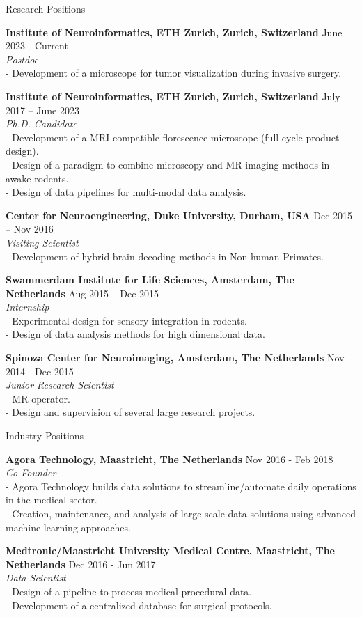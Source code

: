 \documentclass{resume}
\begin{document}
\begin{sections}{Research Positions}

{\bf Institute of Neuroinformatics, ETH Zurich, Zurich, Switzerland} \hfill {June 2023 - Current} 
\\{\textit{Postdoc}}
\\- Development of a microscope for tumor visualization during invasive surgery.

{\bf Institute of Neuroinformatics, ETH Zurich, Zurich, Switzerland} \hfill {July 2017 – June 2023} 
\\{\textit{Ph.D. Candidate}}
\\- Development of a MRI compatible florescence microscope (full-cycle product design).
\\- Design of a paradigm to combine microscopy and MR imaging methods in awake rodents. 
\\- Design of data pipelines for multi-modal data analysis.

{\bf Center for Neuroengineering, Duke University, Durham, USA} \hfill {Dec 2015 – Nov 2016} 
\\{\textit{Visiting Scientist}}
\\- Development of hybrid brain decoding methods in Non-human Primates.

{\bf Swammerdam Institute for Life Sciences, Amsterdam, The Netherlands} \hfill {Aug 2015 – Dec 2015} 
\\{\textit{Internship}}
\\- Experimental design for sensory integration in rodents.
\\- Design of data analysis methods for high dimensional data.

{\bf Spinoza Center for Neuroimaging, Amsterdam, The Netherlands} \hfill {Nov 2014 - Dec 2015} 
\\{\textit{Junior Research Scientist}}
\\- MR operator.
\\- Design and supervision of several large research projects.

\end{sections}

\cleardoublepage

\begin{sections}{Industry Positions}

{\bf Agora Technology, Maastricht, The Netherlands} \hfill {Nov 2016 - Feb 2018} 
\\{\textit{Co-Founder}}
\\- Agora Technology builds data solutions to streamline/automate daily operations in the medical sector.
\\- Creation, maintenance, and analysis of large-scale data solutions using advanced machine learning approaches.

{\bf Medtronic/Maastricht University Medical Centre, Maastricht, The Netherlands} \hfill {Dec 2016 - Jun 2017} 
\\{\textit{Data Scientist}}
\\- Design of a pipeline to process medical procedural data.
\\- Development of a centralized database for surgical protocols.

\end{sections}
\end{document}
